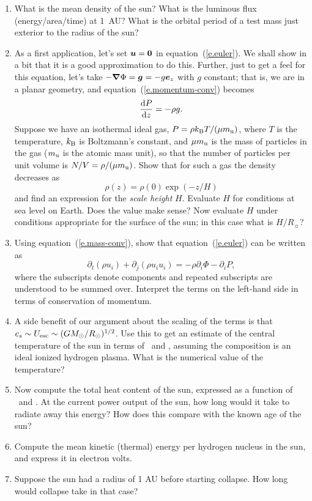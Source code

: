 \begin{enumerate}
\item What is the mean density of the sun? What is the luminous flux (energy/area/time) at 1~AU? What is the orbital period of a test mass just exterior to the radius of the sun?

\item As a first application, let's set $\boldsymbol{u} = \boldsymbol{0}$ in equation~(\ref{e.euler}). We shall show in a bit that it is a good approximation to do this.  Further, just to get a feel for this equation, let's take $-\boldsymbol{\nabla}\Phi = \boldsymbol{g} = -g \boldsymbol{e}_{z}$ with $g$ constant; that is, we are in a planar geometry, and equation~(\ref{e.momentum-conv}) becomes
\begin{equation}\label{e.planar-hydrostatic}
\frac{\mathrm{d} P}{\mathrm{d} z} = -\rho g.
\end{equation}
Suppose we have an isothermal ideal gas, $P = \rho k_\mathrm{B} T/(\mu m_\mathrm{u})$, where $T$ is the temperature, $k_\mathrm{B}$ is Boltzmann's constant, and $\mu m_\mathrm{u}$ is the mass of particles in the gas ($m_\mathrm{u}$ is the atomic mass unit), so that the number of particles per unit volume is $N/V = \rho/(\mu m_\mathrm{u})$.  Show that for such a gas the density decreases as
\[
\rho(z) = \rho(0) \exp\left(-z/H\right)
\]
and find an expression for the \emph{scale height} $H$.  Evaluate $H$ for conditions at sea level on Earth. Does the value make sense? Now evaluate $H$ under conditions appropriate for the surface of the sun; in this case what is $H/R_{\sun}$?

\item Using equation~(\ref{e.mass-conv}), show that equation~(\ref{e.euler}) can be written as
\begin{equation}\label{e.momentum-conv}
\partial_{t}(\rho u_{i}) + \partial_{j}(\rho u_{i}u_{i}) = -\rho\partial_{i}\Phi - \partial_{i}P,
\end{equation}
where the subscripts denote components and repeated subscripts are understood to be summed over. Interpret the terms on the left-hand side in terms of conservation of momentum.

\item A side benefit of our argument about the scaling of the terms is that $c_{s}\sim U_{\mathrm{esc}} \sim (GM_\odot/R_{\odot})^{1/2}$.  Use this to get an estimate of the central temperature of the sun in terms of \Msun\ and \Rsun, assuming the composition is an ideal ionized hydrogen plasma.  What is the numerical value of the temperature?

\item Now compute the total heat content of the sun, expressed as a function of \Msun\ and \Rsun.  At the current power output of the sun, how long would it take to radiate away this energy?  How does this compare with the known age of the sun?

\item Compute the mean kinetic (thermal) energy per hydrogen nucleus in the sun, and express it in electron volts.

\item Suppose the sun had a radius of 1 AU before starting collapse. How long would collapse take in that case?

\end{enumerate}

